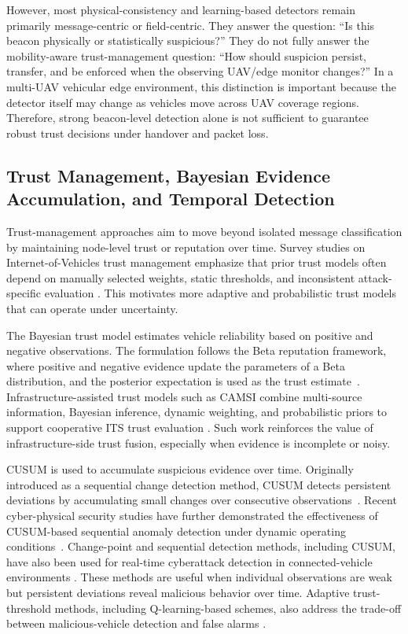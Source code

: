 \documentclass[journal]{IEEEtran}
\begin{document}
However, most physical-consistency and learning-based detectors remain primarily message-centric or field-centric. They answer the question: ``Is this beacon physically or statistically suspicious?'' They do not fully answer the mobility-aware trust-management question: ``How should suspicion persist, transfer, and be enforced when the observing UAV/edge monitor changes?'' In a multi-UAV vehicular edge environment, this distinction is important because the detector itself may change as vehicles move across UAV coverage regions. Therefore, strong beacon-level detection alone is not sufficient to guarantee robust trust decisions under handover and packet loss.

\subsection{Trust Management, Bayesian Evidence Accumulation, and Temporal Detection}
\label{subsec:rw_trust_temporal}

Trust-management approaches aim to move beyond isolated message classification by maintaining node-level trust or reputation over time. Survey studies on Internet-of-Vehicles trust management emphasize that prior trust models often depend on manually selected weights, static thresholds, and inconsistent attack-specific evaluation \cite{siddiqui2021SurveyTrustIoV}. This motivates more adaptive and probabilistic trust models that can operate under uncertainty.

The Bayesian trust model estimates vehicle reliability based on
positive and negative observations. The formulation follows the Beta
reputation framework, where positive and negative evidence update the
parameters of a Beta distribution, and the posterior expectation is
used as the trust estimate~\cite{josang2002}. Infrastructure-assisted
trust models such as CAMSI combine multi-source information, Bayesian
inference, dynamic weighting, and probabilistic priors to support
cooperative ITS trust evaluation \cite{abidi2025CAMSI}. Such work reinforces
the value of infrastructure-side trust fusion, especially when evidence is
incomplete or noisy.

CUSUM is used to accumulate suspicious evidence over time. Originally
introduced as a sequential change detection method, CUSUM detects
persistent deviations by accumulating small changes over consecutive
observations~\cite{page1954}. Recent cyber-physical security studies have
further demonstrated the effectiveness of CUSUM-based sequential anomaly
detection under dynamic operating conditions~\cite{zhang2019cusum}.
Change-point and sequential detection
methods, including CUSUM, have also been used for real-time cyberattack
detection in connected-vehicle environments \cite{comert2021change}. These
methods are useful when individual observations are weak but persistent
deviations reveal malicious behavior over time. Adaptive trust-threshold
methods, including Q-learning-based schemes, also address the trade-off
between malicious-vehicle detection and false alarms \cite{liu2025QART}.
\end{document}
